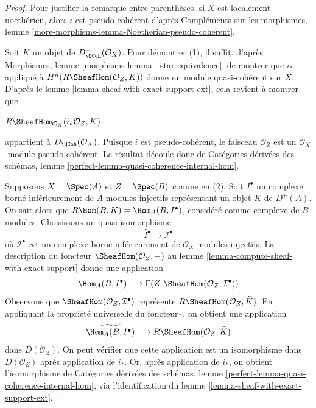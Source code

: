 \begin{proof}
Pour justifier la remarque entre parenthèses, si $X$ est localement noethérien, alors $i$ est pseudo-cohérent d'après Compléments sur les morphismes, lemme \ref{more-morphisms-lemma-Noetherian-pseudo-coherent}.

\medskip\noindent
Soit $K$ un objet de $D^+_\QCoh(\mathcal{O}_X)$. Pour démontrer (1), il suffit, d'après Morphismes, lemme \ref{morphisms-lemma-i-star-equivalence}, de montrer que $i_*$ appliqué à $H^n(R\SheafHom(\mathcal{O}_Z, K))$ donne un module quasi-cohérent sur $X$. D'après le lemme \ref{lemma-sheaf-with-exact-support-ext}, cela revient à montrer que
\par\noindent\hfil
$R\SheafHom_{\mathcal{O}_X}(i_*\mathcal{O}_Z, K)$
\hfil\par\noindent
appartient à $D_\QCoh(\mathcal{O}_X)$. Puisque $i$ est pseudo-cohérent, le faisceau $\mathcal{O}_Z$ est un $\mathcal{O}_X$-module pseudo-cohérent. Le résultat découle donc de Catégories dérivées des schémas, lemme \ref{perfect-lemma-quasi-coherence-internal-hom}.

\medskip\noindent
Supposons $X = \Spec(A)$ et $Z = \Spec(B)$ comme en (2). Soit $I^\bullet$ un complexe borné inférieurement de $A$-modules injectifs représentant un objet $K$ de $D^+(A)$. On sait alors que $R\Hom(B, K) = \Hom_A(B, I^\bullet)$, considéré comme complexe de $B$-modules. Choisissons un quasi-isomorphisme
$$
\widetilde{I^\bullet} \longrightarrow \mathcal{I}^\bullet
$$
où $\mathcal{I}^\bullet$ est un complexe borné inférieurement de $\mathcal{O}_X$-modules injectifs. La description du foncteur $\SheafHom(\mathcal{O}_Z, -)$ au lemme \ref{lemma-compute-sheaf-with-exact-support} donne une application
$$
\Hom_A(B, I^\bullet)
\longrightarrow
\Gamma(Z, \SheafHom(\mathcal{O}_Z, \mathcal{I}^\bullet))
$$
Observons que $\SheafHom(\mathcal{O}_Z, \mathcal{I}^\bullet)$ représente $R\SheafHom(\mathcal{O}_Z, \widetilde{K})$. En appliquant la propriété universelle du foncteur $\widetilde{\ }$, on obtient une application
$$
\widetilde{\Hom_A(B, I^\bullet)}
\longrightarrow
R\SheafHom(\mathcal{O}_Z, \widetilde{K})
$$
dans $D(\mathcal{O}_Z)$. On peut vérifier que cette application est un isomorphisme dans $D(\mathcal{O}_Z)$ après application de $i_*$. Or, après application de $i_*$, on obtient l'isomorphisme de Catégories dérivées des schémas, lemme \ref{perfect-lemma-quasi-coherence-internal-hom}, via l'identification du lemme \ref{lemma-sheaf-with-exact-support-ext}.
\end{proof}


